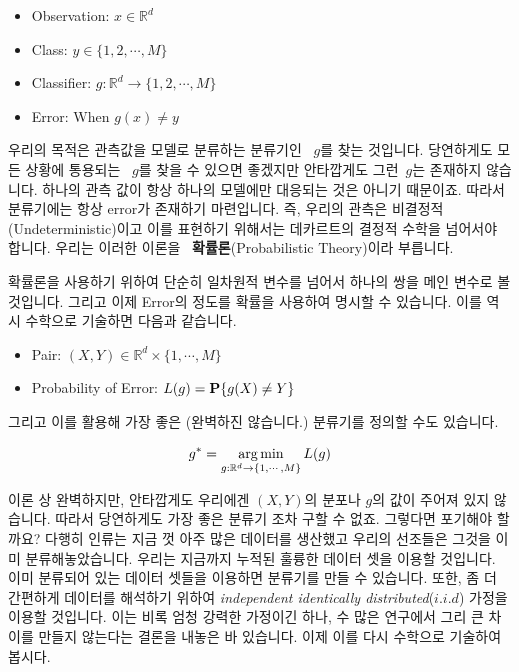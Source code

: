 \documentclass[final]{IEEEphot}
\begin{document}
\begin{itemize}
    \item Observation: $x \in \mathbb{R}^d$
    \item Class: $y \in \{1,2,\cdots,M\}$
    \item Classifier: $g: \mathbb{R}^d \rightarrow \{1,2,\cdots,M\}$
    \item Error: When $g(x) \neq y$
\end{itemize}

\HS 우리의 목적은 관측값을 모델로 분류하는 분류기인  $g$​를 찾는 것입니다. 
당연하게도 모든 상황에 통용되는  $g$​를 찾을 수 있으면 좋겠지만 안타깝게도 그런 ​ $g$​는 존재하지 않습니다. 
하나의 관측 값이 항상 하나의 모델에만 대응되는 것은 아니기 때문이죠. 따라서 분류기에는 항상 error가 존재하기 마련입니다. 
즉, 우리의 관측은 비결정적(Undeterministic)이고 이를 표현하기 위해서는 데카르트의 결정적 수학을 넘어서야 합니다. 
우리는 이러한 이론을  \textbf{확률론}(Probabilistic Theory)이라 부릅니다.

\pagebreak

확률론을 사용하기 위하여 단순히 일차원적 변수를 넘어서 하나의 쌍을 메인 변수로 볼 것입니다. 
그리고 이제 Error의 정도를 확률을 사용하여 명시할 수 있습니다. 이를 역시 수학으로 기술하면 다음과 같습니다.

\begin{itemize}
    \item Pair: $(X,Y) \in \mathbb{R}^d \times \{1,\cdots,M\}$
    \item Probability of Error: $L(g) = \P\{g(X)\neq Y\}$
\end{itemize}

그리고 이를 활용해 가장 좋은 (완벽하진 않습니다.) 분류기를 정의할 수도 있습니다.

\begin{equation}
    g^* = \argmin_{g:\mathbb{R}^d \rightarrow \{1,\cdots,M\}} L(g)
\end{equation}

이론 상 완벽하지만, 안타깝게도 우리에겐 $(X,Y)$의 분포나 $g$의 값이 주어져 있지 않습니다.
따라서 당연하게도 가장 좋은 분류기 조차 구할 수 없죠. 그렇다면 포기해야 할까요?
다행히 인류는 지금 껏 아주 많은 데이터를 생산했고 우리의 선조들은 그것을 이미 분류해놓았습니다.
우리는 지금까지 누적된 훌륭한 데이터 셋을 이용할 것입니다. 이미 분류되어 있는 데이터 셋들을 이용하면 분류기를 만들 수 있습니다. 또한, 좀 더 간편하게 데이터를 해석하기 위하여 \textit{independent identically distributed}($i.i.d$) 가정을 이용할 것입니다. 이는 비록 엄청 강력한 가정이긴 하나, 수 많은 연구에서 그리 큰 차이를 만들지 않는다는 결론을 내놓은 바 있습니다.
이제 이를 다시 수학으로 기술하여 봅시다.
\end{document}
